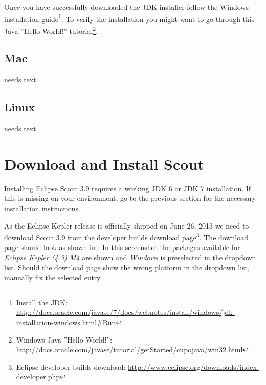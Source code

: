 \documentclass[a4paper,10pt,twoside]{book}
\begin{document}
Once you have successfully downloaded the JDK installer follow the Windows installation 
guide\footnote{Install the JDK: \url{http://docs.oracle.com/javase/7/docs/webnotes/install/windows/jdk-installation-windows.html\#Run}}.
To verify the installation you might want to go through this Java ''Hello World!'' 
tutorial\footnote{Windows Java ''Hello World!'': \url{http://docs.oracle.com/javase/tutorial/getStarted/cupojava/win32.html}}.

\subsection{Mac}
needs text

\subsection{Linux}
needs text

\section{Download and Install Scout}

Installing Eclipse Scout 3.9 requires a working JDK 6 or JDK 7 installation.
If this is missing on your environment, go to the previous section for the necessary installation instructions.

As the Eclipse Kepler release is officially shipped on June 26, 2013 we need to download Scout 3.9 from the developer builds download
page\footnote{Eclipse developer builds download: \url{http://www.eclipse.org/downloads/index-developer.php}}.
The download page should look as shown in .
In this screenshot the packages available for \textit{Eclipse Kepler (4.3) M4} are shown and \textit{Windows} is preselected in the dropdown list.
Should the download page show the wrong platform in the dropdown list, manually fix the selected entry.
\end{document}
